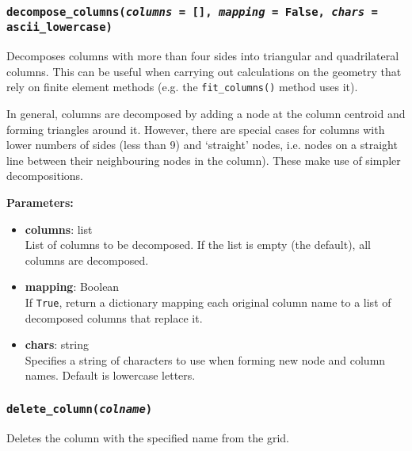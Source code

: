 \begin{snugshade}\subsubsection{\texttt{decompose\_columns(\emph{columns} = [], \emph{mapping} = False, \emph{chars} = ascii\_lowercase)}}\end{snugshade}
\label{sec:mulgrid:decompose_columns}

Decomposes columns with more than four sides into triangular and quadrilateral columns. This can be useful when carrying out calculations on the geometry that rely on finite element methods (e.g. the \texttt{fit\_columns()} method uses it).

In general, columns are decomposed by adding a node at the column centroid and forming triangles around it. However, there are special cases for columns with lower numbers of sides (less than 9) and `straight' nodes, i.e. nodes on a straight line between their neighbouring nodes in the column). These make use of simpler decompositions.

\textbf{Parameters:}
\begin{itemize}
\item \textbf{columns}: list\\
  List of columns to be decomposed. If the list is empty (the default), all columns are decomposed.
\item \textbf{mapping}: Boolean\\
  If \texttt{True}, return a dictionary mapping each original column name to a list of decomposed columns that replace it.
\item \textbf{chars}: string\\
  Specifies a string of characters to use when forming new node and column names.  Default is lowercase letters.
\end{itemize}

\begin{snugshade}\subsubsection{\texttt{delete\_column(\emph{colname})}}\end{snugshade}
\label{sec:mulgrid:delete_column}

Deletes the column with the specified name from the grid.

